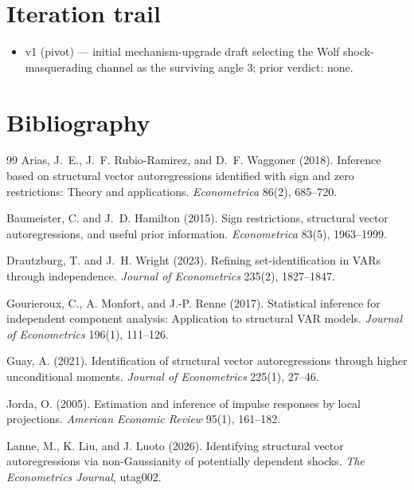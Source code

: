 \documentclass[11pt]{article}
\theoremstyle{definition}
\theoremstyle{plain}
\theoremstyle{remark}
\begin{document}
\section{Iteration trail}
\begin{itemize}[leftmargin=*]
\item v1 (pivot) --- initial mechanism-upgrade draft selecting the Wolf shock-masquerading channel as the surviving angle 3; prior verdict: none.
\end{itemize}

\section*{Bibliography}
\begin{thebibliography}{99}
Arias, J.~E., J.~F. Rubio-Ramirez, and D.~F. Waggoner (2018).
Inference based on structural vector autoregressions identified with sign and zero restrictions: Theory and applications.
\emph{Econometrica} 86(2), 685--720.

Baumeister, C. and J.~D. Hamilton (2015).
Sign restrictions, structural vector autoregressions, and useful prior information.
\emph{Econometrica} 83(5), 1963--1999.

Drautzburg, T. and J.~H. Wright (2023).
Refining set-identification in VARs through independence.
\emph{Journal of Econometrics} 235(2), 1827--1847.

Gourieroux, C., A. Monfort, and J.-P. Renne (2017).
Statistical inference for independent component analysis: Application to structural VAR models.
\emph{Journal of Econometrics} 196(1), 111--126.

Guay, A. (2021).
Identification of structural vector autoregressions through higher unconditional moments.
\emph{Journal of Econometrics} 225(1), 27--46.

Jorda, O. (2005).
Estimation and inference of impulse responses by local projections.
\emph{American Economic Review} 95(1), 161--182.

Lanne, M., K. Liu, and J. Luoto (2026).
Identifying structural vector autoregressions via non-Gaussianity of potentially dependent shocks.
\emph{The Econometrics Journal}, utag002.


\end{thebibliography}
\end{document}

